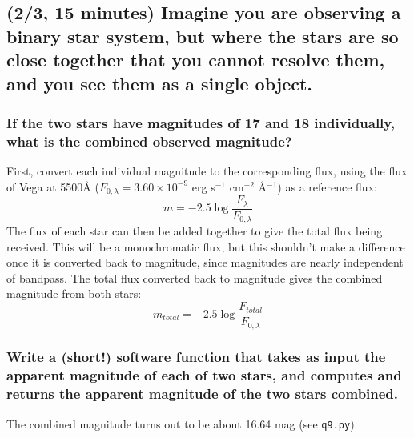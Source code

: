 \documentclass[12pt]{article}
\begin{document}
\subsection*{(2/3, 15 minutes)
Imagine you are observing a binary star system,
but where the stars are so close together that you cannot
resolve them, and you see them as a single object.}

\subsubsection{If the two stars have magnitudes of 17 and 18
individually, what is the combined observed magnitude?}
First, convert each individual magnitude to the corresponding flux,
using the flux of Vega at 5500\AA{}
($F_{0,\lambda} = 3.60\times10^{-9}$ erg s$^{-1}$ cm$^{-2}$
\AA{}$^{-1}$)
as a reference flux:
    $$ m = -2.5\log\frac{F_{\lambda}}{F_{0,\lambda}}  $$
The flux of each star can then be added together to give the total flux
being received. This will be a monochromatic flux, but this shouldn't
make a difference once it is converted back to magnitude,
since magnitudes are nearly independent of bandpass.
The total flux converted back to magnitude gives the combined
magnitude from both stars:
    $$ m_{total} = -2.5\log\frac{F_{total}}{F_{0,\lambda}} $$

\subsubsection{Write a (short!) software function that takes
as input the apparent magnitude of each of two stars,
and computes and returns the apparent magnitude of the
two stars combined.}
The combined magnitude turns out to be about 16.64 mag
(see \texttt{q9.py}).
\end{document}
